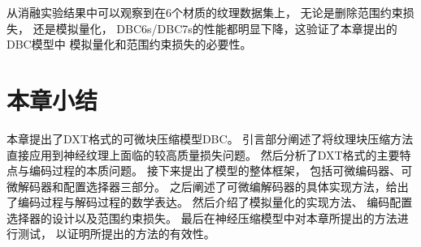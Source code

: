 从消融实验结果中可以观察到在6个材质的纹理数据集上，
无论是删除范围约束损失，
还是模拟量化，
DBC6s/DBC7s的性能都明显下降，这验证了本章提出的DBC模型中
模拟量化和范围约束损失的必要性。

\section{本章小结}

本章提出了DXT格式的可微块压缩模型DBC。
引言部分阐述了将纹理块压缩方法
直接应用到神经纹理上面临的较高质量损失问题。
然后分析了DXT格式的主要特点与编码过程的本质问题。
接下来提出了模型的整体框架，
包括可微编码器、可微解码器和配置选择器三部分。
之后阐述了可微编解码器的具体实现方法，给出了编码过程与解码过程的数学表达。
然后介绍了模拟量化的实现方法、
编码配置选择器的设计以及范围约束损失。
最后在神经压缩模型中对本章所提出的方法进行测试，
以证明所提出的方法的有效性。





